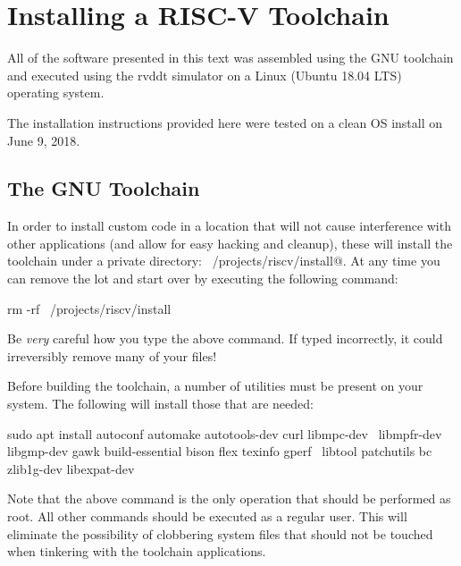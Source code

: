 \chapter{Installing a RISC-V Toolchain}
\label{chapter:install}

All of the software presented in this text was assembled using the
GNU toolchain and executed using the rvddt simulator on a Linux
(Ubuntu 18.04 LTS) operating system.

The installation instructions provided here were tested on a
clean OS install on June 9, 2018.

\section{The GNU Toolchain}

%
In order to install custom code in a location that will not cause 
interference with other applications (and allow for easy hacking and
cleanup), these will install the toolchain under
a private directory: \verb@~/projects/riscv/install@.  At any time
you can remove the lot and start over by executing the following 
command:

\begin{tty}
rm -rf ~/projects/riscv/install
\end{tty}

Be {\em very} careful how you type the above \verb@rm@ command.  
If typed incorrectly, it could irreversibly remove many of your files!

Before building the toolchain, a number of utilities must be present on 
your system.  The following will install those that are needed:

\begin{tty}
sudo apt install autoconf automake autotools-dev curl libmpc-dev \
    libmpfr-dev libgmp-dev gawk build-essential bison flex texinfo gperf \
    libtool patchutils bc zlib1g-dev libexpat-dev
\end{tty}

Note that the above \verb@apt@ command is the only operation that should
be performed as root.  All other commands should be executed as a regular 
user.  This will eliminate the possibility of clobbering system files that 
should not be touched when tinkering with the toolchain applications.

